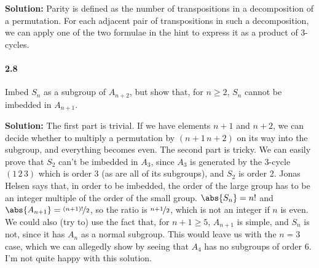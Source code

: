 \documentclass[12pt,a4paper]{article}
\providecommand{\soln}{\textbf{Solution: }}
\providecommand{\JH}{Jonas Helsen\xspace}
\begin{document}
\soln Parity is defined as the number of transpositions in a decomposition of a permutation.
For each adjacent pair of transpositions in such a decomposition, we can apply one of the two formulae in the hint to express it as a product of 3-cycles.

\paragraph*{2.8}
Imbed $S_n$ as a subgroup of $A_{n+2}$, but show that, for $n \geq 2$, $S_n$ cannot be imbedded in $A_{n+1}$.

\soln The first part is trivial. 
If we have elements $n + 1$ and $n + 2$, we can decide whether to multiply a permutation by $(n + 1 \, n + 2)$ on its way into the subgroup, and everything becomes even. 
The second part is tricky. 
We can easily prove that $S_2$ can't be imbedded in $A_{3}$, since $A_3$ is generated by the 3-cycle $(1\,2\,3)$ which is order 3 (as are all of its subgroups), and $S_2$ is order 2.
\JH says that, in order to be imbedded, the order of the large group has to be an integer multiple of the order of the small group. 
$\abs{S_n} = n!$ and $\abs{A_{n + 1}} = \nicefrac{(n + 1)!}{2}$, so the ratio is $\nicefrac{n+1}{2}$, which is not an integer if $n$ is even. 
We could also (try to) use the fact that, for $n + 1 \geq 5$, $A_{n + 1}$ is simple, and $S_n$ is not, since it has $A_n$ as a normal subgroup.
This would leave us with the $n=3$ case, which we can allegedly show by seeing that $A_4$ has no subgroups of order 6.
I'm not quite happy with this solution.
\end{document}
